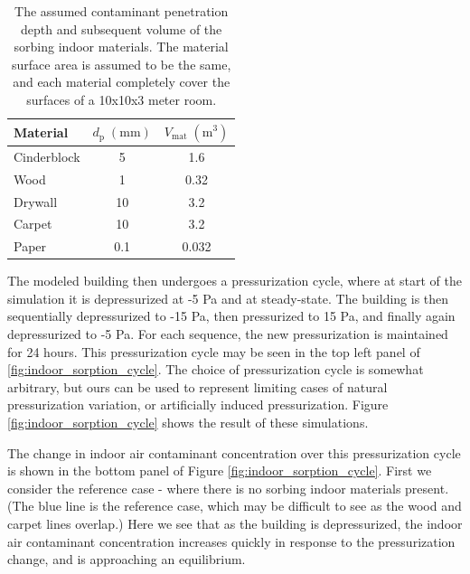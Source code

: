 \begin{table}[htb!]
  \centering
  \begin{tabular}{l c c}
    \toprule
    Material & $d_\mathrm{p} \; \mathrm{(mm)}$ & $V_\mathrm{mat} \; \mathrm{(m^3)}$ \\
    \hline
    Cinderblock & 5 & 1.6 \\
    Wood & 1 & 0.32 \\
    Drywall & 10 & 3.2 \\
    Carpet & 10 & 3.2 \\
    Paper & 0.1 & 0.032 \\
    \bottomrule
  \end{tabular}
  \caption{The assumed contaminant penetration depth and subsequent volume of the sorbing indoor materials. The material surface area is assumed to be the same, and each material completely cover the surfaces of a 10x10x3 meter room.}
  \label{tbl:sorbed_material}
\end{table}

The modeled building then undergoes a pressurization cycle, where at start of the simulation it is depressurized at -5 Pa and at steady-state.
The building is then sequentially depressurized to -15 Pa, then pressurized to 15 Pa, and finally again depressurized to -5 Pa.
For each sequence, the new pressurization is maintained for 24 hours.
This pressurization cycle may be seen in the top left panel of \ref{fig:indoor_sorption_cycle}.
The choice of pressurization cycle is somewhat arbitrary, but ours can be used to represent limiting cases of natural pressurization variation, or artificially induced pressurization.
Figure \ref{fig:indoor_sorption_cycle} shows the result of these simulations.\par

The change in indoor air contaminant concentration over this pressurization cycle is shown in the bottom panel of Figure \ref{fig:indoor_sorption_cycle}.
First we consider the reference case - where there is no sorbing indoor materials present.
(The blue line is the reference case, which may be difficult to see as the wood and carpet lines overlap.)
Here we see that as the building is depressurized, the indoor air contaminant concentration increases quickly in response to the pressurization change, and is approaching an equilibrium.\par

